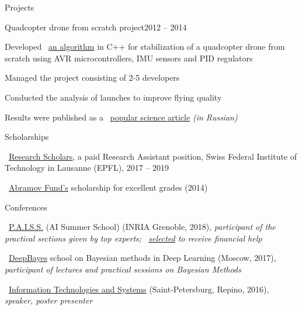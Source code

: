 \documentclass{resume} %
\begin{document}
\begin{rSection}{Projects}
	\begin{rSubsection}{Quadcopter drone from scratch project}{2012 -- 2014}{}{}
		\item Developed \faExternalLink~\href{https://github.com/it-workshop/Quadrocopter}{an algorithm} in C++ for stabilization of a quadcopter drone from scratch using AVR microcontrollers, IMU sensors and PID regulators
		\item Managed the project consisting of 2-5 developers
		\item Conducted the analysis of launches to improve flying quality
		\item Results were published as a \faExternalLink~\href{http://web.archive.org/web/20141016114551/http://habrahabr.ru/company/technoworks/blog/216437/}{popular science article} {\em (in Russian)}
	\end{rSubsection}
\end{rSection}

\begin{rSection}{Scholarships}
	\vspace{-1em}
	\item \faExternalLink~\href{https://ic.epfl.ch/ResearchScholars}{Research Scholars}, a paid Research Assistant position, Swiss Federal Institute of Technology in Lausanne (EPFL), 2017 -- 2019
	\item \faExternalLink~\href{http://phystech-foundation.org/}{Abramov Fund's} scholarship for excellent grades (2014)
\end{rSection}

\begin{rSection}{Conferences}
\vspace{-1em}
\item \faExternalLink~\href{https://project.inria.fr/paiss/}{P.A.I.S.S.} (AI Summer School) (INRIA Grenoble, 2018){, \em participant of the practical sections given by top experts; \faExternalLink~\href{http://www.europe.naverlabs.com/Blog/Students-at-PAISS}{selected} to receive financial help }
\item \faExternalLink~\href{http://deepbayes.ru}{DeepBayes} school on Bayesian methods in Deep Learning (Moscow, 2017){, \em participant of lectures and practical sessions on Bayesian Methods}
\item \faExternalLink~\href{http://iitp.ru/en/conferences/itas}{Information Technologies and Systems} (Saint-Petersburg, Repino, 2016){, \em speaker, poster presenter}
\end{rSection}
\end{document}
